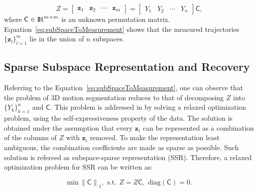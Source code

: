 \documentclass[10pt,twocolumn,letterpaper]{article}  %
\begin{document}
\begin{equation}
\label{eq:subSpaceToMeasurement}
Z = \left[ \begin{array}{cccc} \mathbf{z}_1 \!&\! \mathbf{z}_2 \!&\! \cdots \!&\! \mathbf{z}_m \end{array} \right] = 
\left[ \begin{array}{cccc} Y_1 \!&\! Y_2 \!&\! \cdots \!&\! Y_n \end{array} \right]\mathsf{C},
\end{equation}
where  $\mathsf{C} \in {\rm I\!R}^{m \times m} $ is an unknown permutation matrix. Equation~\eqref{eq:subSpaceToMeasurement} shows that the measured trajectories $\{\mathbf{z}_l\}_{l=1}^{m}$ lie in the union of $n$ subspaces. 

\subsection{Sparse Subspace Representation and Recovery}
Referring to the Equation~\eqref{eq:subSpaceToMeasurement}, one can observe that the problem of 3D motion segmentation reduces to that of decomposing $Z$ into $\{Y_k\}_{k=1}^{n}$ and $\mathsf{C}$. This problem is addressed in \cite{c2} by solving a relaxed optimization problem, using the self-expressiveness property of the data. The solution is obtained under the assumption that every $\mathbf{z}_i$ can be represented as a combination of the columns of $Z$ with $\mathbf{z}_i$ removed. To make the representation least ambiguous, the combination coefficients are made as sparse as possible. Such solution is refereed as subspace-sparse representation (SSR). Therefore, a relaxed optimization problem for SSR can be written as:


\begin{equation}
\label{eq: SSR_1}
 \text{min}\, {\parallel \mathsf{C} \parallel}_1,\,\, \text{s.t.}\, \ Z=Z\mathsf{C},\,\, \text{diag}(\mathsf{C})=0.
\end{equation}
\end{document}
